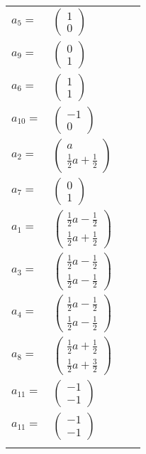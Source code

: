 \documentclass[1p]{elsarticle_modified}
\theoremstyle{definition}
\begin{document}
\begin{tabular}{m{7pt} m{180pt} m{7pt} m{180pt} }
\flushright $a_{5}=$&$\begin{pmatrix}1\\0\end{pmatrix}$ \\
\flushright $a_{9}=$&$\begin{pmatrix}0\\1\end{pmatrix}$ \\
\flushright $a_{6}=$&$\begin{pmatrix}1\\1\end{pmatrix}$ \\
\flushright $a_{10}=$&$\begin{pmatrix}-1\\0\end{pmatrix}$ \\
\flushright $a_{2}=$&$\begin{pmatrix}a\\\frac{1}{2} a+\frac{1}{2}\end{pmatrix}$ \\
\flushright $a_{7}=$&$\begin{pmatrix}0\\1\end{pmatrix}$ \\
\flushright $a_{1}=$&$\begin{pmatrix}\frac{1}{2} a-\frac{1}{2}\\\frac{1}{2} a+\frac{1}{2}\end{pmatrix}$ \\
\flushright $a_{3}=$&$\begin{pmatrix}\frac{1}{2} a-\frac{1}{2}\\\frac{1}{2} a-\frac{1}{2}\end{pmatrix}$ \\
\flushright $a_{4}=$&$\begin{pmatrix}\frac{1}{2} a-\frac{1}{2}\\\frac{1}{2} a-\frac{1}{2}\end{pmatrix}$ \\
\flushright $a_{8}=$&$\begin{pmatrix}\frac{1}{2} a+\frac{1}{2}\\\frac{1}{2} a+\frac{3}{2}\end{pmatrix}$ \\
\flushright $a_{11}=$&$\begin{pmatrix}-1\\-1\end{pmatrix}$\\ \flushright $a_{11}=$&$\begin{pmatrix}-1\\-1\end{pmatrix}$\\&\end{tabular}
\end{document}
